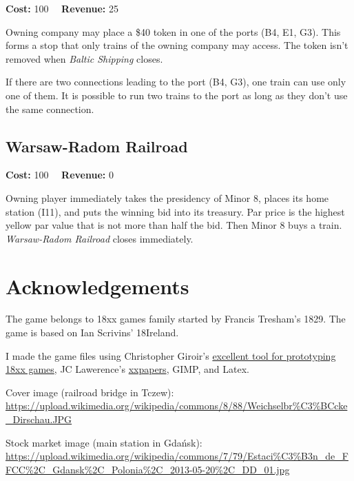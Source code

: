 \documentclass[10pt,a4paper,twocolumn]{article}
\begin{document}
\textbf{Cost:} 100 ~~\textbf{Revenue:} 25

Owning company may place a \$40 token in one of the ports (B4, E1, G3). This forms a stop that only trains of the owning company may access. The token isn't removed when \textit{Baltic Shipping} closes.

If there are two connections leading to the port (B4, G3), one train can use only one of them. It is possible to run two trains to the port as long as they don't use the same connection.

\subsection{Warsaw-Radom Railroad}

\textbf{Cost:} 100 ~~\textbf{Revenue:} 0

Owning player immediately takes the presidency of Minor 8, places its home station (I11), and puts the winning bid into its treasury. Par price is the highest yellow par value that is not more than half the bid. Then Minor 8 buys a train. \textit{Warsaw-Radom Railroad} closes immediately.

\section{Acknowledgements}

The game belongs to 18xx games family started by Francis Tresham's 1829. The game is based on Ian Scrivins' 18Ireland.

I made the game files using Christopher Giroir's \href{https://github.com/kelsin/18xx}{excellent tool for prototyping 18xx games}, JC Lawerence's \href{https://github.com/clearclaw/xxpaper}{xxpapers}, GIMP, and Latex.

Cover image (railroad bridge in Tczew): \url{https://upload.wikimedia.org/wikipedia/commons/8/88/Weichselbr\%C3\%BCcke_Dirschau.JPG}

Stock market image (main station in Gdańsk): \url{https://upload.wikimedia.org/wikipedia/commons/7/79/Estaci\%C3\%B3n_de_FFCC\%2C_Gdansk\%2C_Polonia\%2C_2013-05-20\%2C_DD_01.jpg}
\end{document}
